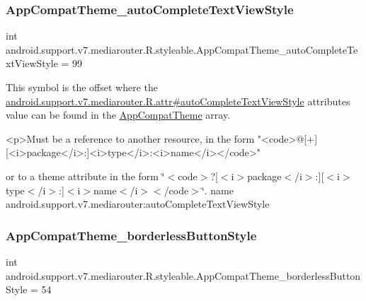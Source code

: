 \subsubsection{\texorpdfstring{App\+Compat\+Theme\+\_\+auto\+Complete\+Text\+View\+Style}{AppCompatTheme\_autoCompleteTextViewStyle}}
{\footnotesize\ttfamily int android.\+support.\+v7.\+mediarouter.\+R.\+styleable.\+App\+Compat\+Theme\+\_\+auto\+Complete\+Text\+View\+Style = 99\hspace{0.3cm}{\ttfamily [static]}}

This symbol is the offset where the \hyperlink{classandroid_1_1support_1_1v7_1_1mediarouter_1_1R_1_1attr_a9e541f92dd093ea02358cbc714efa131}{android.\+support.\+v7.\+mediarouter.\+R.\+attr\#auto\+Complete\+Text\+View\+Style} attribute\textquotesingle{}s value can be found in the \hyperlink{classandroid_1_1support_1_1v7_1_1mediarouter_1_1R_1_1styleable_a4e3d3900c75d49aeb2f283cac00214d6}{App\+Compat\+Theme} array.

\begin{DoxyVerb}      <p>Must be a reference to another resource, in the form "<code>@[+][<i>package</i>:]<i>type</i>:<i>name</i></code>"
\end{DoxyVerb}
 or to a theme attribute in the form \char`\"{}$<$code$>$?\mbox{[}$<$i$>$package$<$/i$>$\+:\mbox{]}\mbox{[}$<$i$>$type$<$/i$>$\+:\mbox{]}$<$i$>$name$<$/i$>$$<$/code$>$\char`\"{}.  name android.\+support.\+v7.\+mediarouter\+:auto\+Complete\+Text\+View\+Style \mbox{\label{classandroid_1_1support_1_1v7_1_1mediarouter_1_1R_1_1styleable_a8a952ea02e2851785b478be273bb3224}} 
\subsubsection{\texorpdfstring{App\+Compat\+Theme\+\_\+borderless\+Button\+Style}{AppCompatTheme\_borderlessButtonStyle}}
{\footnotesize\ttfamily int android.\+support.\+v7.\+mediarouter.\+R.\+styleable.\+App\+Compat\+Theme\+\_\+borderless\+Button\+Style = 54\hspace{0.3cm}{\ttfamily [static]}}

